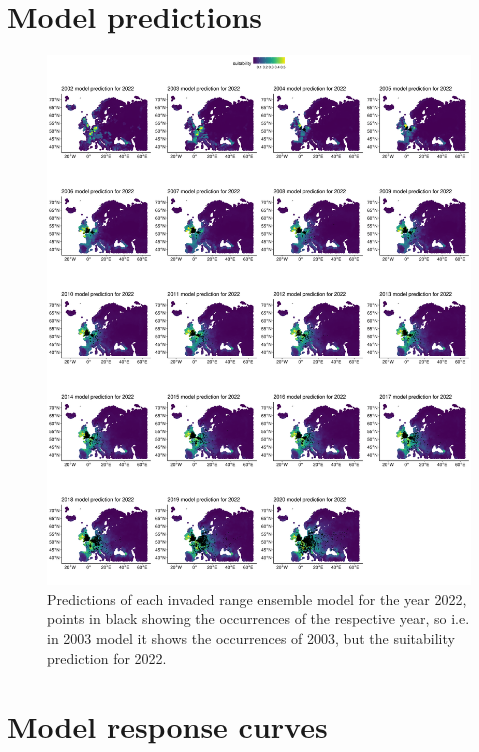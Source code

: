 \section{Model predictions}
\begin{figure}[!h]
    \caption{\label{fig:all_mod_preds} Predictions of each invaded range ensemble model for the year 2022, points in black showing the occurrences of the respective year, so i.e. in 2003 model it shows the occurrences of 2003, but the suitability prediction for 2022.}
    \centerline{
        \includegraphics[width = 0.85\paperwidth, height = 0.62\paperheight]{"../../R/figures/2003to2021-mod-pred.png"}
    }
\end{figure}

\section{Model response curves} \label{sec:response_curves}

